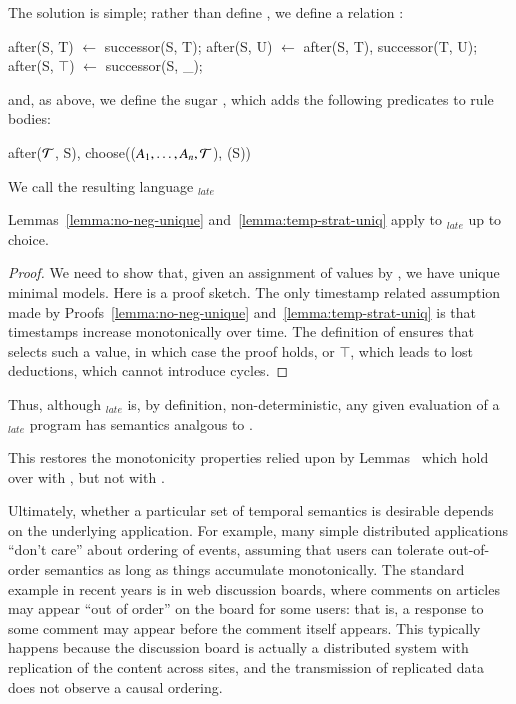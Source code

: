 The solution is simple; rather than define , we define a relation :

\begin{Dedalus}
after(S, T) \(\leftarrow\) successor(S, T);
after(S, U) \(\leftarrow\) after(S, T), successor(T, U);
after(S, \(\top\)) \(\leftarrow\) successor(S, _);
\end{Dedalus}

and, as above, we define the sugar , which adds the
following predicates to rule bodies:

\begin{Dedalus}
after(\(\Tau\), S),
choose((\(A_1, \ldots, A_n, \Tau\)), (S))
\end{Dedalus}

We call the resulting language \lang$_{late}$


\begin{lemma}
Lemmas~\ref{lemma:no-neg-unique} and~\ref{lemma:temp-strat-uniq} apply
to \lang$_{late}$ up to choice.
\begin{proof}
We need to show that, given an assignment of values by
, we have unique minimal models.  Here is a proof
sketch.  The only timestamp related assumption made by
Proofs~\ref{lemma:no-neg-unique} and~\ref{lemma:temp-strat-uniq} is
that timestamps increase monotonically over time.  The definition of
 ensures that  selects such a value, in
which case the proof holds, or $\top$, which leads to lost deductions,
which cannot introduce cycles.
\end{proof}
\end{lemma}

Thus, although \lang$_{late}$ is, by definition, non-deterministic, any given evaluation of a \lang$_{late}$ program has semantics analgous to \slang.

This restores the monotonicity properties relied upon by
Lemmas~ which hold over \lang with , but
not with .

Ultimately, whether a particular set of temporal semantics is
desirable depends on the underlying application.  For example, many simple distributed applications ``don't care'' about ordering of events, assuming that users can tolerate out-of-order semantics as long as things accumulate monotonically.  The standard example in recent years is in web discussion boards, where comments on articles may appear ``out of order'' on the board for some users: that is, a response to some comment may appear before the comment itself appears.  This typically happens because the discussion board is actually a distributed system with replication of the content across sites, and the transmission of replicated data does not observe a causal ordering.

